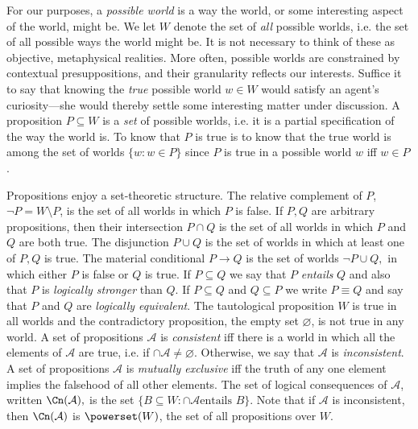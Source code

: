 For our purposes, a {\em possible world} is a way the world, or some interesting
aspect of the world, might be. We let $W$ denote the set of {\em all} possible
worlds, i.e. the set of all possible ways the world might be. It is not
necessary to think of these as objective, metaphysical realities. More often,
possible worlds are constrained by contextual presuppositions, and their
granularity reflects our interests. Suffice it to say that knowing the {\em
true} possible world $w\in W$ would satisfy an agent's curiosity---she would
thereby settle some interesting matter under discussion. A proposition
$P\subseteq W$ is a {\em set} of possible worlds, i.e. it is a partial
specification of the way the world is. To know that $P$ is true is to know that
the true world is among the set of worlds $\{ w : w \in P \}$ since $P$ is true
in a possible world $w$ iff $w\in P$.

Propositions enjoy a set-theoretic structure. The relative complement of $P$,
$\neg P = W\setminus P$, is the set of all worlds in which $P$ is false. If
$P,Q$ are arbitrary propositions, then their intersection $P\cap Q$ is the set
of all worlds in which $P$ and $Q$ are both true. The disjunction $P\cup Q$ is
the set of worlds in which at least one of $P,Q$ is true. The material
conditional $P\rightarrow Q$ is the set of worlds $\neg P \cup Q,$ in which
either $P$ is false or $Q$ is true. If $P\subseteq Q$ we say that $P$ {\em
entails} $Q$ and also that $P$ is {\em logically stronger} than $Q$. If
$P\subseteq Q$ and $Q\subseteq P$ we write $P\equiv Q$ and say that $P$ and $Q$
are {\em logically equivalent}.  The tautological proposition $W$ is true in all
worlds and the contradictory proposition, the empty set $\varnothing$, is not
true in any world. A set of propositions $\mathcal{A}$ is {\em consistent} iff
there is a world in which all the elements of $\mathcal{A}$ are true, i.e. if
$\cap \mathcal{A} \neq \varnothing.$ Otherwise, we say that $\mathcal{A}$ is
{\em inconsistent}. A set of propositions $\mathcal{A}$ is {\em mutually
exclusive} iff the truth of any one element implies the falsehood of all other
elements. The set of logical consequences of $\mathcal{A}$, written
$\Cn(\mathcal{A}),$ is the set $ \{ B \subseteq W : \cap \mathcal{A} \text{
entails } B \}$. Note that if $\mathcal{A}$ is inconsistent, then
$\Cn(\mathcal{A})$ is $\powerset(W)$, the set of all propositions over $W$.  

